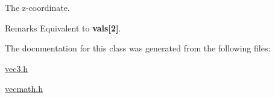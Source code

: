 The z-\/coordinate. 

\begin{DoxyRemark}{Remarks}
Equivalent to {\bfseries vals\mbox{[}2\mbox{]}}. 
\end{DoxyRemark}


The documentation for this class was generated from the following files\+:\begin{DoxyCompactItemize}
\item 
\hyperlink{vec3_8h}{vec3.\+h}\item 
\hyperlink{vecmath_8h}{vecmath.\+h}\end{DoxyCompactItemize}
